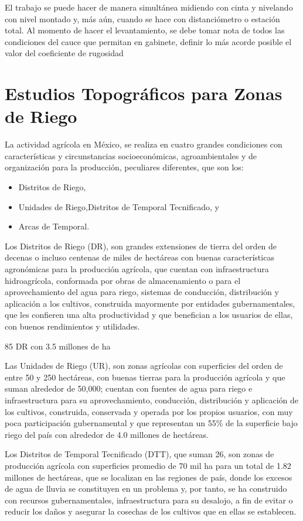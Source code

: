       El trabajo se puede hacer de manera simultánea midiendo con cinta y nivelando con nivel montado y, más aún, cuando se hace con distanciómetro o estación total.
      Al momento de hacer el levantamiento, se debe tomar nota de todos las condiciones del cauce que permitan en gabinete, definir lo más acorde posible el valor del coeficiente de rugosidad
      
\section{Estudios Topográficos para Zonas de Riego}
      
      La actividad agrícola en México, se realiza en cuatro grandes condiciones con características y circunstancias
      socioeconómicas,
      agroambientales y de
      organización para la producción, peculiares diferentes, que son los:
      \begin{itemize}
          \item Distritos de Riego,
          \item Unidades de Riego,Distritos de Temporal Tecnificado, y
          \item Arcas de Temporal.
      \end{itemize}
      Los Distritos de Riego (DR), son grandes extensiones de tierra del orden de decenas o incluso centenas de miles de hectáreas con buenas características agronómicas para la producción agrícola, que cuentan con infraestructura hidroagrícola, conformada por obras de almacenamiento o para el aprovechamiento del agua para riego, sistemas de conducción, distribución y aplicación a los cultivos, construida mayormente por entidades gubernamentales, que les confieren una alta productividad y que benefician a los usuarios de ellas, con buenos rendimientos y utilidades.
      
      85 DR con 3.5 millones de ha
      
      Las Unidades de Riego (UR), son zonas agrícolas con superficies del orden de entre 50 y 250 hectáreas, con buenas tierras para la producción agrícola y que suman alrededor de 50,000; cuentan con fuentes de agua para riego e infraestructura para su aprovechamiento, conducción, distribución y aplicación de los cultivos, construida, conservada y operada por los propios usuarios, con muy poca participación gubernamental y que representan un 55\% de la superficie bajo riego del país con alrededor de 4.0 millones de hectáreas.
      
      Los Distritos de Temporal Tecnificado (DTT), que suman 26, son zonas de producción agrícola con superficies promedio de 70 mil ha para un total de 1.82 millones de hectáreas, que se localizan en las regiones de país, donde los excesos de agua de lluvia se constituyen en un problema y, por tanto, se ha construido con recursos gubernamentales, infraestructura para su desalojo, a fin de evitar o reducir los daños y asegurar la cosechas de los cultivos que en ellas se establecen.
      
